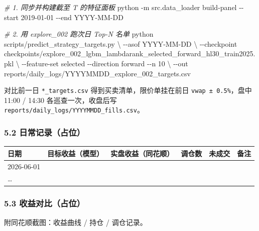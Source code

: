 \documentclass[
  fontset=fandol]{ctexart}
\newenvironment{Shaded}{\begin{snugshade}}{\end{snugshade}}
\newcommand{\AttributeTok}[1]{\textcolor[rgb]{0.77,0.63,0.00}{#1}}
\newcommand{\CommentTok}[1]{\textcolor[rgb]{0.56,0.35,0.01}{\textit{#1}}}
\newcommand{\DataTypeTok}[1]{\textcolor[rgb]{0.13,0.29,0.53}{#1}}
\newcommand{\ExtensionTok}[1]{#1}
\newcommand{\NormalTok}[1]{#1}
\begin{document}
\begin{Shaded}
\begin{Highlighting}[]
\CommentTok{\# 1. 同步并构建截至 T 的特征面板}
\ExtensionTok{python} \AttributeTok{{-}m}\NormalTok{ src.data\_loader build{-}panel }\AttributeTok{{-}{-}start}\NormalTok{ 2019{-}01{-}01 }\AttributeTok{{-}{-}end}\NormalTok{ YYYY{-}MM{-}DD}

\CommentTok{\# 2. 用 explore\_002 跑次日 Top{-}N 名单}
\ExtensionTok{python}\NormalTok{ scripts/predict\_strategy\_targets.py }\DataTypeTok{\textbackslash{}}
  \AttributeTok{{-}{-}asof}\NormalTok{ YYYY{-}MM{-}DD }\DataTypeTok{\textbackslash{}}
  \AttributeTok{{-}{-}checkpoint}\NormalTok{ checkpoints/explore\_002\_lgbm\_lambdarank\_selected\_forward\_hl30\_train2025.pkl }\DataTypeTok{\textbackslash{}}
  \AttributeTok{{-}{-}feature{-}set}\NormalTok{ selected }\AttributeTok{{-}{-}direction}\NormalTok{ forward }\AttributeTok{{-}{-}n}\NormalTok{ 10 }\DataTypeTok{\textbackslash{}}
  \AttributeTok{{-}{-}out}\NormalTok{ reports/daily\_logs/YYYYMMDD\_explore\_002\_targets.csv}
\end{Highlighting}
\end{Shaded}

对比前一日 \texttt{*\_targets.csv}
得到买卖清单，限价单挂在前日
\texttt{vwap\ ±\ 0.5\%}，盘中 11:00 /
14:30 各巡查一次，收盘后写
\texttt{reports/daily\_logs/YYYYMMDD\_fills.csv}。

\hypertarget{ux65e5ux5e38ux8bb0ux5f55ux5360ux4f4d}{%
\subsubsection{5.2
日常记录（占位）}\label{ux65e5ux5e38ux8bb0ux5f55ux5360ux4f4d}}

\begin{longtable}[]{@{}llllll@{}}
\toprule
日期 & 目标收益（模型） &
实盘收益（同花顺） & 调仓数 & 未成交 &
备注 \\
\midrule
\endhead
2026-06-01 & & & & & \\
\ldots{} & & & & & \\
\bottomrule
\end{longtable}

\hypertarget{ux6536ux76caux5bf9ux6bd4ux5360ux4f4d}{%
\subsubsection{5.3
收益对比（占位）}\label{ux6536ux76caux5bf9ux6bd4ux5360ux4f4d}}

附同花顺截图：收益曲线 / 持仓 /
调仓记录。
\end{document}
